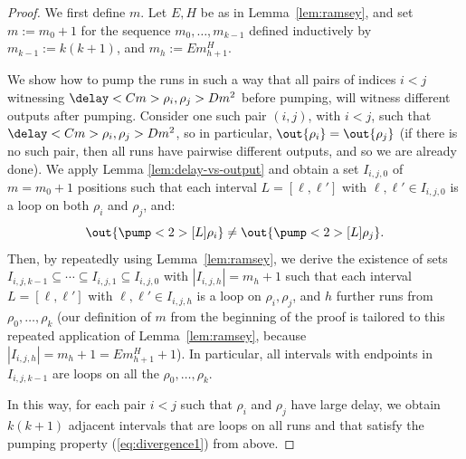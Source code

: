 \documentclass{article}
\begin{document}
\begin{proof}
We first define $m$. %
Let $E,H$ be as in Lemma~\ref{lem:ramsey}, and set $m:=m_0+1$ for 
the sequence $m_0, \ldots, m_{k-1}$ defined inductively by 
$m_{k-1} := k(k+1)$, and 
$m_h := E m_{h+1}^H$. 

We show how to pump the runs in such a way that all pairs of indices $i<j$
witnessing $\delay<C m>{\rho_i,\rho_j} > D m^2$ before pumping,
will witness different outputs after pumping.
Consider one such pair $(i,j)$, with $i<j$, such that 
$\delay<C m>{\rho_i,\rho_j} > D m^2$, so in particular,
$\out{\rho_i} = \out{\rho_j}$
(if there is no such pair, then all runs have pairwise different
outputs, and so we are already done).
We apply Lemma \ref{lem:delay-vs-output}
and obtain a set $I_{i,j,0}$ of $m = m_0+1$ positions such that each interval $L=[\ell,\ell']$ with $\ell,\ell' \in I_{i,j,0}$ is a loop on both $\rho_i$ and $\rho_j$, and:
\begin{equation}\label{eq:divergence1}
  \out{\pump<2>[L]{\rho_i}} \neq \out{\pump<2>[L]{\rho_j}}.
\end{equation}
Then, by repeatedly using Lemma~\ref{lem:ramsey}, 
we derive the existence of sets $I_{i,j,k-1} \subseteq  \cdots \subseteq I_{i,j,1} \subseteq I_{i,j,0}$ with $|I_{i,j,h}| = m_h+1$ such that each interval $L=[\ell,\ell']$ with $\ell,\ell' \in I_{i,j,h}$ is a loop on $\rho_i,\rho_j$, and $h$ further runs from $\rho_0,\ldots,\rho_k$ (our definition of $m$ from the 
beginning of the proof is tailored to this repeated application
of Lemma~\ref{lem:ramsey}, because $|I_{i,j,h}| = m_h+1 = E m_{h+1}^H +1$). In particular, all intervals with endpoints in $I_{i,j,k-1}$ are loops on all the $\rho_0,\ldots,\rho_k$.

In this way, for each pair $i<j$ such that $\rho_i$ and $\rho_j$ 
have large delay, we obtain $k(k+1)$ adjacent intervals that are loops on all runs and that satisfy the pumping property (\ref{eq:divergence1}) from above.


\end{proof}
\end{document}
